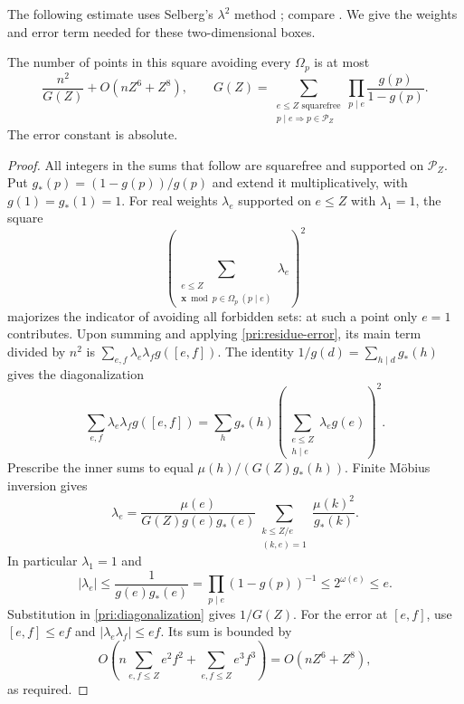 The following estimate uses Selberg's $\lambda^2$ method
\cite{Selberg1947}; compare \cite[Section~3.2]{MontgomeryVaughan2007}.
We give the weights and error term needed for these two-dimensional boxes.

\begin{lemma}\label{pri:upper-sieve}
The number of points in this square avoiding every $\Omega_p$ is at most
\begin{equation}\label{pri:sieve-bound}
            \frac{n^2}{G(Z)}+O(nZ^6+Z^8),\qquad
 G(Z)=\sum_{\substack{e\le Z\text{ squarefree}\\p\mid e\Rightarrow p\in\mathcal P_Z}}
                           \prod_{p\mid e}\frac{g(p)}{1-g(p)}.
\end{equation}
The error constant is absolute.
\end{lemma}

\begin{proof}
All integers in the sums that follow are squarefree and supported on
$\mathcal P_Z$.  Put $g_*(p)=(1-g(p))/g(p)$ and extend it
multiplicatively, with $g(1)=g_*(1)=1$.  For real weights $\lambda_e$
supported on $e\le Z$ with $\lambda_1=1$, the square
\[
       \left(\sum_{\substack{e\le Z\\
                 \mathbf x\bmod p\in\Omega_p\ (p\mid e)}}\lambda_e\right)^2
\]
majorizes the indicator of avoiding all forbidden sets: at such a point
only $e=1$ contributes.  Upon summing and applying
\eqref{pri:residue-error}, its main term divided by $n^2$ is
$\sum_{e,f}\lambda_e\lambda_fg([e,f])$.
The identity $1/g(d)=\sum_{h\mid d}g_*(h)$ gives the diagonalization
\begin{equation}\label{pri:diagonalization}
 \sum_{e,f}\lambda_e\lambda_fg([e,f])
   =\sum_hg_*(h)
            \left(\sum_{\substack{e\le Z\\h\mid e}}\lambda_eg(e)\right)^2.
\end{equation}
Prescribe the inner sums to equal
$\mu(h)/(G(Z)g_*(h))$.  Finite M\"obius inversion gives
\begin{equation}\label{pri:weights}
 \lambda_e=\frac{\mu(e)}{G(Z)g(e)g_*(e)}
       \sum_{\substack{k\le Z/e\\(k,e)=1}}
                       \frac{\mu(k)^2}{g_*(k)}.
\end{equation}
In particular $\lambda_1=1$ and
\[
             |\lambda_e|\le\frac1{g(e)g_*(e)}
                  =\prod_{p\mid e}(1-g(p))^{-1}
                  \le2^{\omega(e)}\le e.
\]
Substitution in \eqref{pri:diagonalization} gives $1/G(Z)$.
For the error at $[e,f]$, use $[e,f]\le ef$ and
$|\lambda_e\lambda_f|\le ef$.  Its sum is bounded by
\[
     O\!\left(n\sum_{e,f\le Z}e^2f^2+
                       \sum_{e,f\le Z}e^3f^3\right)
                           =O(nZ^6+Z^8),
\]
as required.
\end{proof}

